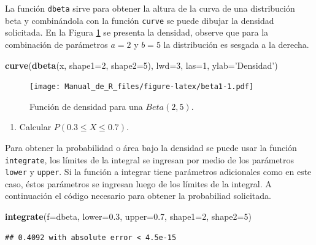 \documentclass[10pt,]{krantz}
\makeatletter
\newenvironment{Shaded}{\begin{snugshade}}{\end{snugshade}}
\newcommand{\KeywordTok}[1]{\textcolor[rgb]{0.13,0.29,0.53}{\textbf{#1}}}
\newcommand{\DataTypeTok}[1]{\textcolor[rgb]{0.13,0.29,0.53}{#1}}
\newcommand{\DecValTok}[1]{\textcolor[rgb]{0.00,0.00,0.81}{#1}}
\newcommand{\FloatTok}[1]{\textcolor[rgb]{0.00,0.00,0.81}{#1}}
\newcommand{\StringTok}[1]{\textcolor[rgb]{0.31,0.60,0.02}{#1}}
\newcommand{\NormalTok}[1]{#1}
\providecommand{\tightlist}{%
  \setlength{\itemsep}{0pt}\setlength{\parskip}{0pt}}
\newenvironment{kframe}{%
\medskip{}
\setlength{\fboxsep}{.8em}
 \def\at@end@of@kframe{}%
 \ifinner\ifhmode%
  \def\at@end@of@kframe{\end{minipage}}%
  \begin{minipage}{\columnwidth}%
 \fi\fi%
 \def\FrameCommand##1{\hskip\@totalleftmargin \hskip-\fboxsep
 \colorbox{shadecolor}{##1}\hskip-\fboxsep
     \hskip-\linewidth \hskip-\@totalleftmargin \hskip\columnwidth}%
 \MakeFramed {\advance\hsize-\width
   \@totalleftmargin\z@ \linewidth\hsize
   \@setminipage}}%
 {\par\unskip\endMakeFramed%
 \at@end@of@kframe}
\renewenvironment{Shaded}{\begin{kframe}}{\end{kframe}}
\makeatother
\begin{document}
La función \texttt{dbeta} sirve para obtener la altura de la curva de
una distribución beta y combinándola con la función \texttt{curve} se
puede dibujar la densidad solicitada. En la Figura \ref{fig:beta1} se
presenta la densidad, observe que para la combinación de parámetros
\(a=2\) y \(b=5\) la distribución es sesgada a la derecha.

\begin{Shaded}
\begin{Highlighting}[]
\KeywordTok{curve}\NormalTok{(}\KeywordTok{dbeta}\NormalTok{(x, }\DataTypeTok{shape1=}\DecValTok{2}\NormalTok{, }\DataTypeTok{shape2=}\DecValTok{5}\NormalTok{), }\DataTypeTok{lwd=}\DecValTok{3}\NormalTok{, }\DataTypeTok{las=}\DecValTok{1}\NormalTok{,}
      \DataTypeTok{ylab=}\StringTok{'Densidad'}\NormalTok{)}
\end{Highlighting}
\end{Shaded}

\begin{figure}
\centering
\texttt{[image: Manual\_de\_R\_files/figure-latex/beta1-1.pdf]}
\caption{\label{fig:beta1}Función de densidad para una \(Beta(2, 5)\).}
\end{figure}

\begin{enumerate}
\def\labelenumi{\arabic{enumi})}
\setcounter{enumi}{1}
\tightlist
\item
  Calcular \(P(0.3 \leq X \leq 0.7)\).
\end{enumerate}

Para obtener la probabilidad o área bajo la densidad se puede usar la
función \texttt{integrate}, los límites de la integral se ingresan por
medio de los parámetros \texttt{lower} y \texttt{upper}. Si la función a
integrar tiene parámetros adicionales como en este caso, éstos
parámetros se ingresan luego de los límites de la integral. A
continuación el código necesario para obtener la probabiliad solicitada.

\begin{Shaded}
\begin{Highlighting}[]
\KeywordTok{integrate}\NormalTok{(}\DataTypeTok{f=}\NormalTok{dbeta, }\DataTypeTok{lower=}\FloatTok{0.3}\NormalTok{, }\DataTypeTok{upper=}\FloatTok{0.7}\NormalTok{,}
          \DataTypeTok{shape1=}\DecValTok{2}\NormalTok{, }\DataTypeTok{shape2=}\DecValTok{5}\NormalTok{)}
\end{Highlighting}
\end{Shaded}

\begin{verbatim}
## 0.4092 with absolute error < 4.5e-15
\end{verbatim}
\end{document}
